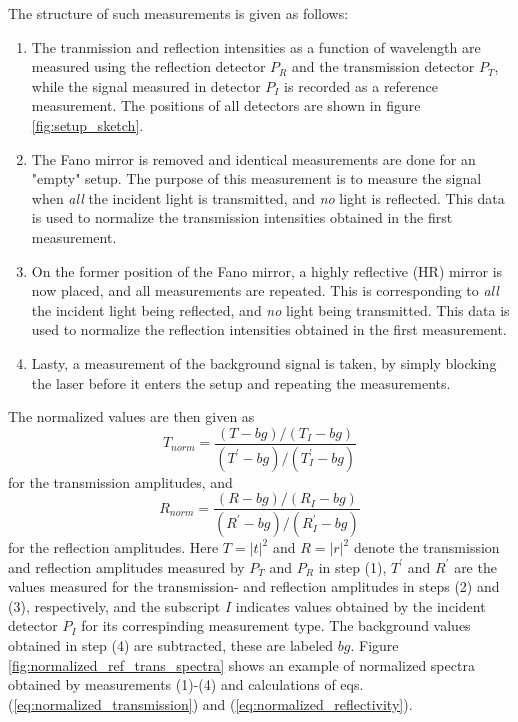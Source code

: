 The structure of such measurements is given as follows: 
\begin{enumerate}
    \item The tranmission and reflection intensities as a function of wavelength are measured using the reflection detector $P_R$ and the transmission detector $P_T$, while the signal measured in detector $P_I$ is recorded as a reference measurement. The positions of all detectors are shown in figure \ref{fig:setup_sketch}. 
    \item The Fano mirror is removed and identical measurements are done for an "empty" setup. The purpose of this measurement is to measure the signal when \emph{all} the incident light is transmitted, and \emph{no} light is reflected. This data is used to normalize the transmission intensities obtained in the first measurement. 
    \item On the former position of the Fano mirror, a highly reflective (HR) mirror is now placed, and all measurements are repeated. This is corresponding to \emph{all} the incident light being reflected, and \emph{no} light being transmitted. This data is used to normalize the reflection intensities obtained in the first measurement.
    \item Lasty, a measurement of the background signal is taken, by simply blocking the laser before it enters the setup and repeating the measurements. 
\end{enumerate}

The normalized values are then given as
\begin{equation}
    T_{norm} = \frac{(T-bg)/(T_I-bg)}{(T^{\prime}-bg)/(T_I^{\prime}-bg)}
    \label{eq:normalized_transmission}
\end{equation}
for the transmission amplitudes, and
\begin{equation}
    R_{norm} = \frac{(R-bg)/(R_I-bg)}{(R^{\prime}-bg)/(R_I^{\prime}-bg)}
    \label{eq:normalized_reflectivity}
\end{equation}
for the reflection amplitudes. Here $T=|t|^2$ and $R=|r|^2$ denote the transmission and reflection amplitudes measured by $P_T$ and $P_R$ in step (1), $T^{\prime}$ and $R^{\prime}$ are the values measured for the transmission- and reflection amplitudes in steps (2) and (3), respectively, and the subscript $I$ indicates values obtained by the incident detector $P_I$ for its correspinding measurement type. The background values obtained in step (4) are subtracted, these are labeled $bg$. Figure \ref{fig:normalized_ref_trans_spectra} shows an example of normalized spectra obtained by measurements (1)-(4) and calculations of eqs. (\ref{eq:normalized_transmission}) and (\ref{eq:normalized_reflectivity}).

